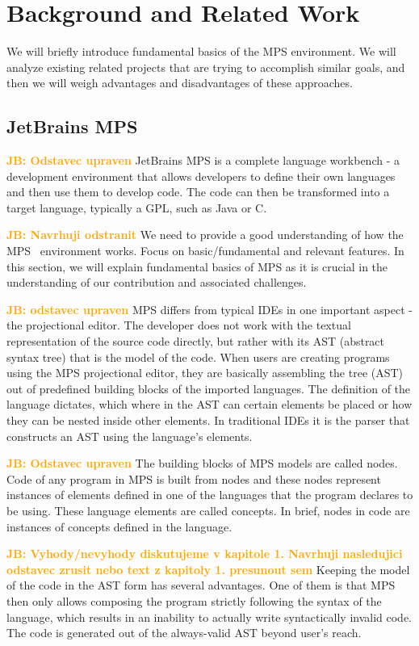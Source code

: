 \documentclass[10pt]{sigplanconf}
\newcommand{\JB}[1]{\textcolor{orange}{\bfseries JB: #1}} %
\begin{document}
\section{Background and Related Work}

We will briefly introduce fundamental basics of the MPS environment.
We will analyze existing related projects that are trying to accomplish similar goals, and then we will weigh advantages and disadvantages of these approaches.

\subsection{JetBrains MPS}

\JB{Odstavec upraven} JetBrains MPS is a complete language workbench - a development environment that allows developers to define their own languages and then use them to develop code. The code can then be transformed into a target language, typically a GPL, such as Java or C.

\JB{Navrhuji odstranit} We need to provide a good understanding of how the MPS~\cite{ref:MPS} environment works.
Focus on basic/fundamental and relevant features. In this section, we will explain fundamental basics of MPS as it is crucial in the understanding of our contribution and associated challenges.

\JB{odstavec upraven} MPS differs from typical IDEs in one important aspect - the projectional editor. The developer does not work with the textual representation of the source code directly, but rather with its AST (abstract syntax tree) that is the model of the code. When users are creating programs using the MPS projectional editor, they are basically assembling the tree (AST) out of predefined building blocks of the imported languages. The definition of the language dictates, which where in the AST can certain elements be placed or how they can be nested inside other elements. In traditional IDEs it is the parser that constructs an AST using the language's elements.

\JB{Odstavec upraven} The building blocks of MPS models are called nodes. Code of any program in MPS is built from nodes and these nodes represent instances of elements defined in one of the languages that the program declares to be using. These language elements are called concepts. In brief, nodes in code are instances of concepts defined in the language.

\JB{Vyhody/nevyhody diskutujeme v kapitole 1. Navrhuji nasledujici odstavec zrusit nebo text z kapitoly 1. presunout sem}
Keeping the model of the code in the AST form has several advantages.
One of them is that MPS then only allows composing the program strictly following the syntax of the language, which results in an inability to actually write syntactically invalid code.
The code is generated out of the always-valid AST beyond user's reach.
\end{document}
